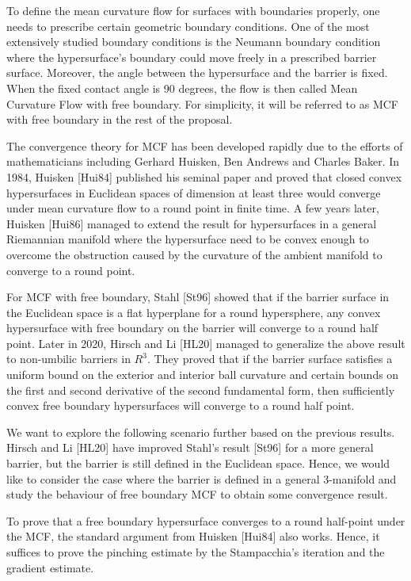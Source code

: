 To define the mean curvature flow for surfaces with boundaries properly, one needs to prescribe certain geometric boundary conditions. One of the most extensively studied boundary conditions is the Neumann boundary condition where the hypersurface's boundary could move freely in a prescribed barrier surface. Moreover, the angle between the hypersurface and the barrier is fixed. When the fixed contact angle is 90 degrees, the flow is then called Mean Curvature Flow with free boundary. For simplicity, it will be referred to as MCF with free boundary in the rest of the proposal.
 
The convergence theory for MCF has been developed rapidly due to the efforts of mathematicians including Gerhard Huisken, Ben Andrews and Charles Baker. In 1984, Huisken [Hui84] published his seminal paper and proved that closed convex hypersurfaces in Euclidean spaces of dimension at least three would converge under mean curvature flow to a round point in finite time. A few years later, Huisken [Hui86] managed to extend the result for hypersurfaces in a general Riemannian manifold where the hypersurface need to be convex enough to overcome the obstruction caused by the curvature of the ambient manifold to converge to a round point.

For MCF with free boundary, Stahl [St96] showed that if the barrier surface in the Euclidean space is a flat hyperplane for a round hypersphere, any convex hypersurface with free boundary on the barrier will converge to a round half point. Later in 2020, Hirsch and Li [HL20] managed to generalize the above result to non-umbilic barriers in $R^3$. They proved that if the barrier surface satisfies a uniform bound on the exterior and interior ball curvature and certain bounds on the first and second derivative of the second fundamental form, then sufficiently convex free boundary hypersurfaces will converge to a round half point.

We want to explore the following scenario further based on the previous results. Hirsch and Li [HL20] have improved Stahl's result [St96] for a more general barrier, but the barrier is still defined in the Euclidean space. Hence, we would like to consider the case where the barrier is defined in a general 3-manifold and study the behaviour of free boundary MCF to obtain some convergence result.

To prove that a free boundary hypersurface converges to a round half-point under the MCF, the standard argument from Huisken [Hui84] also works. Hence, it suffices to prove the pinching estimate by the Stampacchia's iteration and the gradient estimate. 

